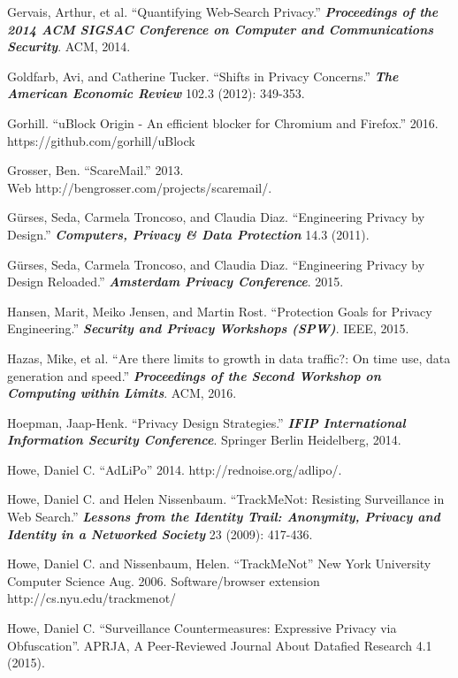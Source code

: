 \documentclass[conference]{IEEEtran}
\begin{document}
\begin{thebibliography}{99}
 Gervais, Arthur, et al. “Quantifying Web-Search Privacy.” \textbf{\textit{Proceedings of the 2014 ACM SIGSAC Conference on Computer and Communications Security}}. ACM, 2014.

 Goldfarb, Avi, and Catherine Tucker. “Shifts in Privacy Concerns.” \textbf{\textit{The American Economic Review}} 102.3 (2012): 349-353.

 Gorhill. “uBlock Origin - An efficient blocker for Chromium and Firefox.” 2016. https://github.com/gorhill/uBlock

 Grosser, Ben. “ScareMail.” 2013.\\ Web http://bengrosser.com/projects/scaremail/.

 G\"urses, Seda, Carmela Troncoso, and Claudia Diaz. “Engineering Privacy by Design.” \textbf{\textit{Computers, Privacy \& Data Protection}} 14.3 (2011).

 G\"urses, Seda, Carmela Troncoso, and Claudia Diaz. “Engineering Privacy by Design Reloaded.” \textbf{\textit{Amsterdam Privacy Conference}}. 2015.

 Hansen, Marit, Meiko Jensen, and Martin Rost. “Protection Goals for Privacy Engineering.” \textbf{\textit{Security and Privacy Workshops (SPW)}}. IEEE, 2015.

 Hazas, Mike, et al. “Are there limits to growth in data traffic?: On time use, data generation and speed.” \textbf{\textit{Proceedings of the Second Workshop on Computing within Limits}}. ACM, 2016.

 Hoepman, Jaap-Henk. “Privacy Design Strategies.” \textbf{\textit{IFIP International Information Security Conference}}. Springer Berlin Heidelberg, 2014.

 Howe, Daniel C. “AdLiPo” 2014. http://rednoise.org/adlipo/.

 Howe, Daniel C. and Helen Nissenbaum. “TrackMeNot: Resisting Surveillance in Web Search.” \textbf{\textit{Lessons from the Identity Trail: Anonymity, Privacy and Identity in a Networked Society}} 23 (2009): 417-436.

 Howe, Daniel C. and Nissenbaum, Helen. “TrackMeNot” New York University Computer Science Aug. 2006. Software/browser extension http://cs.nyu.edu/trackmenot/

 Howe, Daniel C. “Surveillance Countermeasures: Expressive Privacy via Obfuscation”. APRJA, A Peer-Reviewed Journal About Datafied Research 4.1 (2015).


\end{thebibliography}
\end{document}
